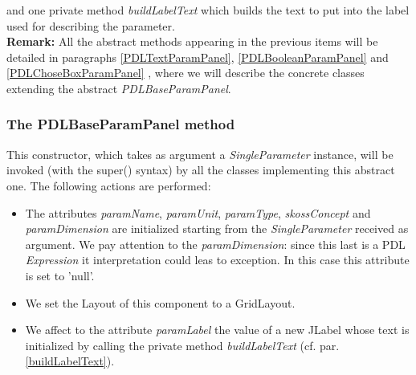 \documentclass[a4paper,11pt] {ivoa}
\begin{document}
and one private method {\it buildLabelText} which builds the text to put into the label used for describing the parameter.\\
{\bf Remark:} All the abstract methods appearing in the previous items will be detailed in paragraphs \ref{PDLTextParamPanel}, \ref{PDLBooleanParamPanel} and \ref{PDLChoseBoxParamPanel} , where we will describe the concrete classes extending the abstract {\it PDLBaseParamPanel}.

\subsubsection{The PDLBaseParamPanel method}\label{PDLBaseParamPanel}
This constructor, which takes as argument a {\it SingleParameter} instance, will be invoked (with the super() syntax) by all the classes implementing this abstract one. The following actions are performed:
\begin{itemize}
\item The attributes {\it paramName},  {\it paramUnit},  {\it paramType},  {\it skossConcept} and  {\it paramDimension} are initialized starting from the {\it SingleParameter} received as argument. We pay attention to the  {\it paramDimension}: since this last is a PDL {\it Expression} it interpretation could leas to exception. In this case this attribute is set to 'null'.
\item We set the Layout of this component to a GridLayout.
\item We affect to the attribute {\it paramLabel} the value of a new {JLabel} whose text is initialized by calling the private method {\it buildLabelText} (cf. par. \ref{buildLabelText}).
\end{itemize}
\end{document}
